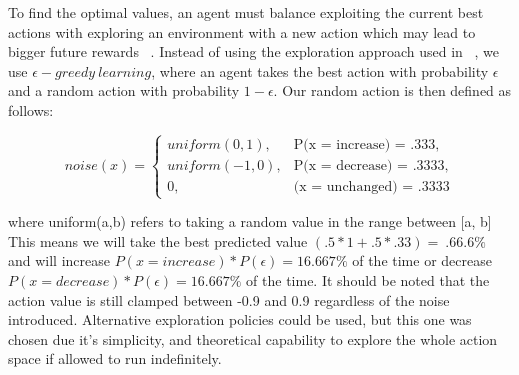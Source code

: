 To find the optimal values, an agent must balance exploiting the current best actions with exploring an environment with a new action which may lead to bigger future rewards ~\cite{Sutton:1998:IRL:551283}. Instead of using the exploration approach used in ~\cite{DDPG}, we use $\epsilon-greedy\ learning$, where an agent takes the best action with probability $\epsilon$ and a random action with probability $1 - \epsilon$. Our random action is then defined as follows:

\[
noise(x) = 
\begin{cases}

uniform(0,1), &\text{P(x = increase) = .333},\\
uniform(-1,0), &\text{P(x = decrease) = .3333},\\
0, & \text{(x = unchanged) = .3333}
\end{cases}
\]

where uniform(a,b) refers to taking a random value in the range between [a, b]
This means we will take the best predicted value $(.5 * 1 + .5 * .33) =  ~.66.6\%$  and will increase $P(x= increase) * P(\epsilon) = 16. 667\%$ of the time or decrease $P(x= decrease) * P(\epsilon) = 16. 667\%$ of the time. It should be noted that the action value is still clamped between -0.9 and 0.9 regardless of the noise introduced. Alternative exploration policies could be used, but this one was chosen due it’s simplicity, and theoretical capability to explore the whole action space if allowed to run indefinitely.
